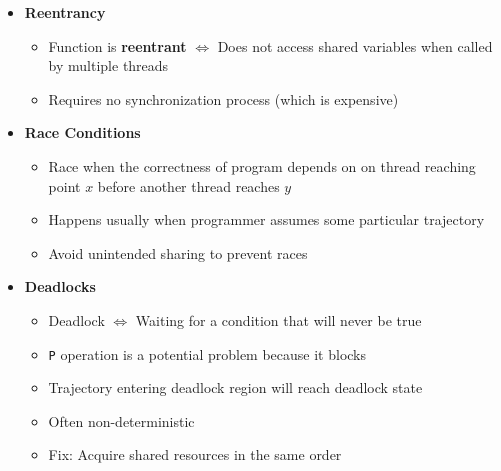 \documentclass[12pt]{article}
\begin{document}
{\begin{itemize}
\begin{itemize}
\begin{enumerate}
\begin{itemize}
			\end{itemize}
			\item Functions that call other unsafe functions
			\begin{itemize}
				\item Just don't call them
			\end{itemize}
		\end{enumerate}
	\end{itemize}	
	\item \textbf{Reentrancy}
	\begin{itemize}
		\item Function is \textbf{reentrant} $\iff$ Does not access shared variables when called by multiple threads
		\item Requires no synchronization process (which is expensive)
	\end{itemize}
	\item \textbf{Race Conditions}
	\begin{itemize}
		\item Race when the correctness of program depends on on thread reaching point $ x $ before another thread reaches $ y $
		\item Happens usually when programmer assumes some particular trajectory
		\item Avoid unintended sharing to prevent races
	\end{itemize}
	\item \textbf{Deadlocks}
	\begin{itemize}
		\item Deadlock $\iff$ Waiting for a condition that will never be true
		\item \texttt{P} operation is a potential problem because it blocks
		\item Trajectory entering deadlock region will reach deadlock state
		\item Often non-deterministic
		\item Fix: Acquire shared resources in the same order
	\end{itemize}
\end{itemize}

\pagebreak

}
\end{document}
